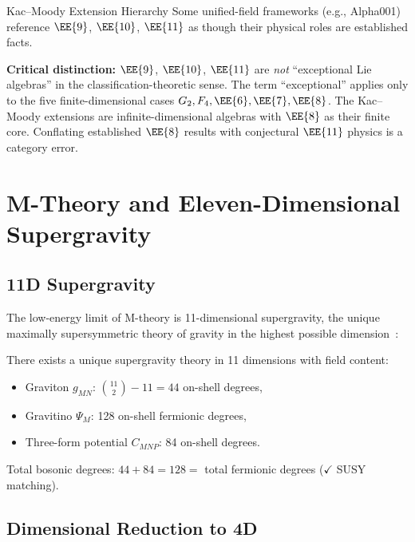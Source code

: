 \begin{frameworkclaim}{Kac--Moody Extension Hierarchy}
Some unified-field frameworks (e.g., Alpha001) reference $\EE{9}$, $\EE{10}$,
$\EE{11}$ as though their physical roles are established facts.

\textbf{Critical distinction:}  $\EE{9}$, $\EE{10}$, $\EE{11}$ are
\emph{not} ``exceptional Lie algebras'' in the classification-theoretic
sense.  The term ``exceptional'' applies only to the five
finite-dimensional cases $G_2, F_4, \EE{6}, \EE{7}, \EE{8}$.  The
Kac--Moody extensions are infinite-dimensional algebras with $\EE{8}$ as
their finite core.  Conflating established $\EE{8}$ results with
conjectural $\EE{11}$ physics is a category error.
\end{frameworkclaim}

\section{M-Theory and Eleven-Dimensional Supergravity}
\label{sec:m_theory}

\subsection{11D Supergravity}

The low-energy limit of M-theory is 11-dimensional supergravity, the unique
maximally supersymmetric theory of gravity in the highest possible
dimension~\cite{cremmer1978}:

\begin{theorem}
\label{thm:11d_sugra}
There exists a unique supergravity theory in 11 dimensions with field content:
\begin{itemize}
    \item Graviton $g_{MN}$: $\binom{11}{2} - 11 = 44$ on-shell degrees,
    \item Gravitino $\Psi_M$: 128 on-shell fermionic degrees,
    \item Three-form potential $C_{MNP}$: 84 on-shell degrees.
\end{itemize}
Total bosonic degrees: $44 + 84 = 128 = $ total fermionic degrees
($\checkmark$ SUSY matching).
\end{theorem}

\subsection{Dimensional Reduction to 4D}

